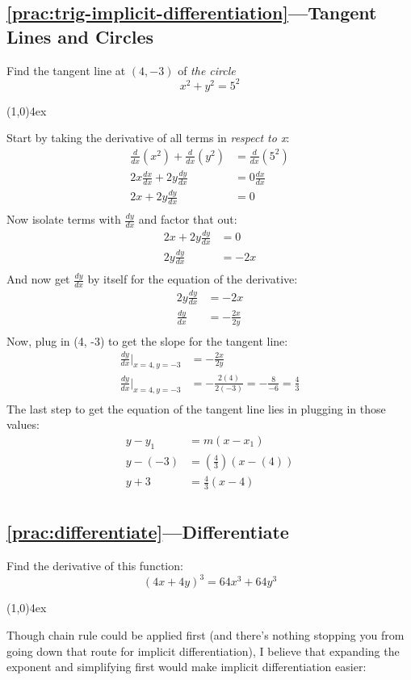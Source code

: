 \documentclass{MathNotes}
\newcommand{\br}{
	\begin{center}
		\line(1,0){4ex}
	\end{center}}
\begin{document}
\subsection*{\ref{prac:trig-implicit-differentiation}---Tangent Lines and Circles}\label{ans:trig-implicit-differentation}
Find the tangent line at $(4,-3)$ of \textit{the circle}
\[x^2+y^2=5^2\]
\br
Start by taking the derivative of all terms in \textit{respect to x}:
\begin{align*}
	\frac{d}{dx}(x^2)+\frac{d}{dx}(y^2) & =\frac{d}{dx}(5^2) \\
	2x\frac{dx}{dx}+2y\frac{dy}{dx}     & =0\frac{dx}{dx}    \\
	2x+2y\frac{dy}{dx}                  & =0                 \\
\end{align*}
Now isolate terms with $\frac{dy}{dx}$ and factor that out:
\begin{align*}
	2x+2y\frac{dy}{dx} & =0   \\
	2y\frac{dy}{dx}    & =-2x \\
\end{align*}
And now get $\frac{dy}{dx}$ by itself for the equation of the derivative:
\begin{align*}
	2y\frac{dy}{dx} & =-2x            \\
	\frac{dy}{dx}   & =-\frac{2x}{2y} \\
\end{align*}
Now, plug in (4, -3) to get the slope for the tangent line:
\begin{align*}
	\frac{dy}{dx}\Big|_{x=4,y=-3} & =-\frac{2x}{2y}                                \\
	\frac{dy}{dx}\Big|_{x=4,y=-3} & =-\frac{2(4)}{2(-3)}=-\frac{8}{-6}=\frac{4}{3} \\
\end{align*}
The last step to get the equation of the tangent line lies in plugging in those
values:
\begin{align*}
	y-y_1  & =m(x-x_1)             \\
	y-(-3) & =(\frac{4}{3})(x-(4)) \\
	y+3    & =\frac{4}{3}(x-4)     \\
\end{align*}

\newpage
\subsection*{\ref{prac:differentiate}---Differentiate}\label{ans:differentiate}
Find the derivative of this function: \[(4x+4y)^3=64x^3+64y^3\]
\br
Though chain rule could be applied first (and there's nothing stopping you from
going down that route for implicit differentiation), I believe that expanding
the exponent and simplifying first would make implicit differentiation easier:
\end{document}
